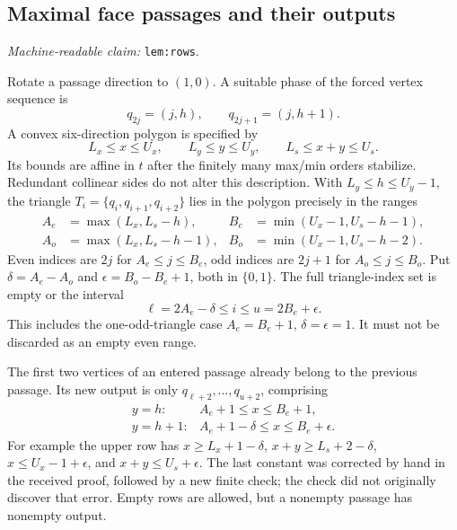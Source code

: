 \documentclass[11pt]{amsart}
\newcommand{\record}[1]{\nolinkurl{#1}}
\newcommand{\claimid}[1]{\par\nopagebreak\noindent\textit{Machine-readable claim:} \record{#1}.\par}
\theoremstyle{definition}\newtheorem{definition}{Definition}
\begin{document}
\subsection{Maximal face passages and their outputs}\label{lem:rows}
\claimid{lem:rows}
Rotate a passage direction to $(1,0)$. A suitable phase of the forced
vertex sequence is
\begin{equation}\label{eq:rows}
 q_{2j}=(j,h),\qquad q_{2j+1}=(j,h+1).
\end{equation}
A convex six-direction polygon is specified by
\[
 L_x\le x\le U_x,\qquad L_y\le y\le U_y,\qquad
 L_s\le x+y\le U_s.
\]
Its bounds are affine in $t$ after the finitely many max/min orders
stabilize. Redundant collinear sides do not alter this description.
With $L_y\le h\le U_y-1$, the triangle
$T_i=\{q_i,q_{i+1},q_{i+2}\}$ lies in the polygon precisely in the ranges
\begin{equation}\label{eq:triangle-bounds}
\begin{aligned}
 A_e&=\max(L_x,L_s-h),& B_e&=\min(U_x-1,U_s-h-1),\\
 A_o&=\max(L_x,L_s-h-1),& B_o&=\min(U_x-1,U_s-h-2).
\end{aligned}
\end{equation}
Even indices are $2j$ for $A_e\le j\le B_e$, odd indices are $2j+1$
for $A_o\le j\le B_o$. Put $\delta=A_e-A_o$ and
$\epsilon=B_o-B_e+1$, both in $\{0,1\}$. The full triangle-index set
is empty or the interval
\begin{equation}\label{eq:passage}
 \ell=2A_e-\delta\le i\le u=2B_e+\epsilon.
\end{equation}
This includes the one-odd-triangle case $A_e=B_e+1$,
$\delta=\epsilon=1$. It must not be discarded as an empty even range.

The first two vertices of an entered passage already belong to the
previous passage. Its new output is only
$q_{\ell+2},\ldots,q_{u+2}$, comprising
\begin{equation}\label{eq:output}
\begin{array}{ll}
 y=h:   &A_e+1\le x\le B_e+1,\\
 y=h+1: &A_e+1-\delta\le x\le B_e+\epsilon.
\end{array}
\end{equation}
For example the upper row has
$x\ge L_x+1-\delta$, $x+y\ge L_s+2-\delta$,
$x\le U_x-1+\epsilon$, and $x+y\le U_s+\epsilon$.
The last constant was corrected by hand in the received proof, followed
by a new finite check; the check did not originally discover that error.
Empty rows are allowed, but a nonempty passage has nonempty output.
\end{document}
